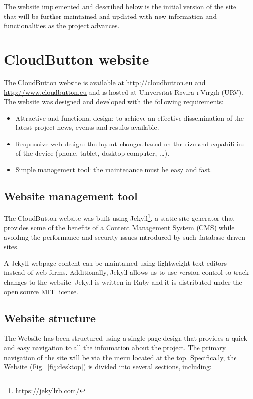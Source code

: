 \documentclass[a4paper,11pt]{article}
\numberwithin{table}{subsection} %
\begin{document}
The website implemented and described below is the initial version of the site that will be further maintained and updated with new information and functionalities as the project advances.

\section{CloudButton website}

The CloudButton website is available at \url{http://cloudbutton.eu} and \url{http://www.cloudbutton.eu} and is hosted at Universitat Rovira i Virgili (URV).
The website was designed and developed with the following requirements:

\begin{itemize}
\item Attractive and functional design: to achieve an effective dissemination of the latest project news, events and results available.
\item Responsive web design: the layout changes based on the size and capabilities of the device (phone, tablet, desktop computer, ...).
\item Simple management tool: the maintenance must be easy and fast. 
\end{itemize}

\subsection{Website management tool}

The CloudButton website was built using Jekyll\footnote{\url{https://jekyllrb.com/}}, a static-site generator that provides some of the benefits of a Content Management System (CMS) while avoiding the performance and security issues introduced by such database-driven sites. 

A Jekyll webpage content can be maintained using lightweight text editors instead of web forms. Additionally, Jekyll allows us to use version control to track changes to the website. Jekyll is written in Ruby and it is distributed under the open source MIT license.

\subsection{Website structure}


The Website has been structured using a single page design that provides a quick and easy navigation to all the information about the project. The primary navigation of the site will be via the menu located at the top.
Specifically, the Website (Fig.~\ref{fig:desktop}) is divided into several sections, including:
\end{document}
